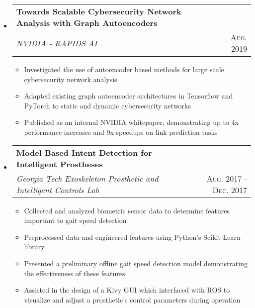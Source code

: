 \documentclass[letterpaper,11pt]{article}
\makeatletter
\newcommand{\resumePlainItem}[1]{
  \item\small{#1 \vspace{-1.0pt}}
}
\newcommand{\resumeSubheading}[4]{
  \vspace{-1pt}\item[]
    \begin{tabular*}{0.97\textwidth}{l@{\extracolsep{\fill}}r}
      \textbf{#1} & #2 \\
      \textit{\small#3} & \textsc{\small #4} \\ %
    \end{tabular*}\vspace{-5pt}
}
\newcommand{\resumeSubHeadingListStart}{\begin{itemize}[leftmargin=*]}
\newcommand{\resumeSubHeadingListEnd}{\end{itemize}}
\newcommand{\resumeItemListStart}{\begin{itemize}}
\newcommand{\resumeItemListEnd}{\end{itemize}\vspace{-5pt}}
\newenvironment{resumeItemList}{\resumeItemListStart}{\resumeItemListEnd}
\newenvironment{resumeSubheadingList}{\resumeSubHeadingListStart}{\resumeSubHeadingListEnd}
\makeatother
\begin{document}
\begin{resumeSubheadingList}
\begin{resumeItemList}
    \end{resumeItemList}

    \resumeSubheading
    {Towards Scalable Cybersecurity Network Analysis with Graph Autoencoders}{}
    {NVIDIA - RAPIDS AI}{Aug. 2019}
    \begin{resumeItemList}
      \resumePlainItem{Investigated the use of autoencoder based methods for large scale cybersecurity network analysis}
      \resumePlainItem{Adapted existing graph autoencoder architectures in Tensorflow and PyTorch to static and dynamic
      cybersecurity networks}
      \resumePlainItem{Published as an internal NVIDIA whitepaper, demonstrating up to 4x performance increases and 
      9x speedups on link prediction tasks}
    \end{resumeItemList}

    \resumeSubheading
    {Model Based Intent Detection for Intelligent Prostheses}{}
    {Georgia Tech Exoskeleton Prosthetic and Intelligent Controls Lab}{Aug. 2017 - Dec. 2017}
    \begin{resumeItemList}
      \resumePlainItem{Collected and analyzed biometric sensor data to determine features important to gait
      speed detection}
      \resumePlainItem{Preprocessed data and engineered features using Python's Scikit-Learn library} %
      \resumePlainItem{Presented a preliminary offline gait speed detection model demonstrating the effectiveness of these features}
      \resumePlainItem{Assisted in the design of a Kivy GUI which interfaced with ROS to visualize and adjust a prosthetic's control
      parameters during operation}
    \end{resumeItemList}
  \end{resumeSubheadingList}
\end{document}
